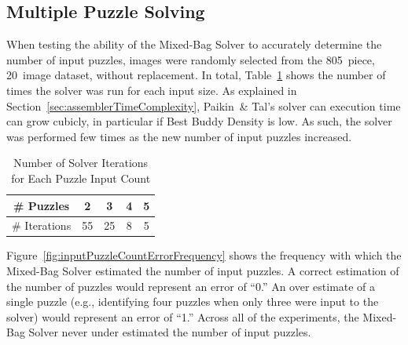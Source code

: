 \subsection{Multiple Puzzle Solving}

When testing the ability of the Mixed-Bag Solver to accurately determine the number of input puzzles, images were randomly selected from the 805~piece, 20~image dataset, without replacement.  In total, Table~\ref{tab:numberSolverIterations} shows the number of times the solver was run for each input size.  As explained in Section~\ref{sec:assemblerTimeComplexity}, Paikin~\& Tal's solver can execution time can grow cubicly, in particular if Best Buddy Density is low.  As such, the solver was performed few times as the new number of input puzzles increased.

\begin{table}[tb]
\begin{center}
\begin{tabular}{ c||c|c|c|c } 
 \toprule
 \# Puzzles    &  2 &  3 & 4 & 5 \\ 
\hline \hline
 \# Iterations & 55 & 25 & 8 & 5 \\ 
 \bottomrule
\end{tabular}
\end{center}
\caption{Number of Solver Iterations for Each Puzzle Input Count}\label{tab:numberSolverIterations}
\end{table}

Figure~\ref{fig:inputPuzzleCountErrorFrequency} shows the frequency with which the Mixed-Bag Solver estimated the number of input puzzles.  A correct estimation of the number of puzzles would represent an error of ``0.''  An over estimate of a single puzzle (e.g., identifying four puzzles when only three were input to the solver) would represent an error of ``1.''  Across all of the experiments, the Mixed-Bag Solver never under estimated the number of input puzzles.  

